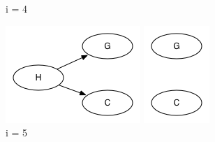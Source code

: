 \documentclass[11pt,a4paper]{article}
\begin{document}
\begin{figure}[h]
\begin{minipage}[t]{4 cm}
		\caption{i = 4}
  	\end{minipage}
  	\begin{minipage}[t]{4 cm}
		\includegraphics[width=\linewidth]{101c5}
		\caption{i = 5}
  	\end{minipage}
  	\begin{minipage}[t]{4 cm}
		\includegraphics[width=\linewidth]{101c6}

\end{minipage}
\end{figure}
\end{document}
